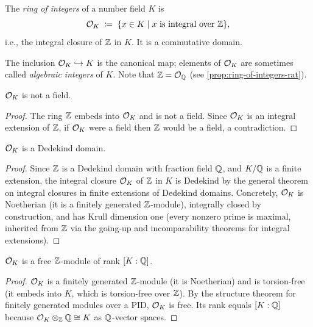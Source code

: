 \begin{definition}
  \label{def:ring-of-integers}
  \leanok
  The \emph{ring of integers} of a number field $K$ is
  \[
    \mathcal{O}_K \;\coloneqq\; \{ x \in K \mid x \text{ is integral over } \mathbb{Z} \},
  \]
  i.e., the integral closure of $\mathbb{Z}$ in $K$. It is a commutative domain.
\end{definition}

\begin{remark}
  The inclusion $\mathcal{O}_K \hookrightarrow K$ is the canonical map; elements of
  $\mathcal{O}_K$ are sometimes called \emph{algebraic integers} of $K$.
  Note that $\mathbb{Z} = \mathcal{O}_{\mathbb{Q}}$ (see \cref{prop:ring-of-integers-rat}).
\end{remark}

\begin{proposition}
  \label{prop:ring-of-integers-not-field}
  \leanok
  $\mathcal{O}_K$ is not a field.
\end{proposition}
\begin{proof}
  \leanok
  The ring $\mathbb{Z}$ embeds into $\mathcal{O}_K$ and is not a field. Since $\mathcal{O}_K$ is
  an integral extension of $\mathbb{Z}$, if $\mathcal{O}_K$ were a field then $\mathbb{Z}$ would
  be a field, a contradiction.
\end{proof}

\begin{theorem}
  \label{thm:ring-of-integers-dedekind}
  \leanok
  $\mathcal{O}_K$ is a Dedekind domain.
\end{theorem}
\begin{proof}
  \leanok
  Since $\mathbb{Z}$ is a Dedekind domain with fraction field $\mathbb{Q}$, and $K/\mathbb{Q}$
  is a finite extension, the integral closure $\mathcal{O}_K$ of $\mathbb{Z}$ in $K$ is
  Dedekind by the general theorem on integral closures in finite extensions
  of Dedekind domains. Concretely, $\mathcal{O}_K$ is Noetherian (it is a finitely
  generated $\mathbb{Z}$-module), integrally closed by construction, and has Krull
  dimension one (every nonzero prime is maximal, inherited from $\mathbb{Z}$ via
  the going-up and incomparability theorems for integral extensions).
\end{proof}

\begin{theorem}
  \label{thm:ring-of-integers-free}
  \leanok
  $\mathcal{O}_K$ is a free $\mathbb{Z}$-module of rank $[K : \mathbb{Q}]$.
\end{theorem}
\begin{proof}
  \leanok
  $\mathcal{O}_K$ is a finitely generated $\mathbb{Z}$-module (it is Noetherian) and is
  torsion-free (it embeds into $K$, which is torsion-free over $\mathbb{Z}$). By
  the structure theorem for finitely generated modules over a PID, $\mathcal{O}_K$
  is free. Its rank equals $[K:\mathbb{Q}]$ because $\mathcal{O}_K \otimes_{\mathbb{Z}} \mathbb{Q} \cong K$
  as $\mathbb{Q}$-vector spaces.
\end{proof}

